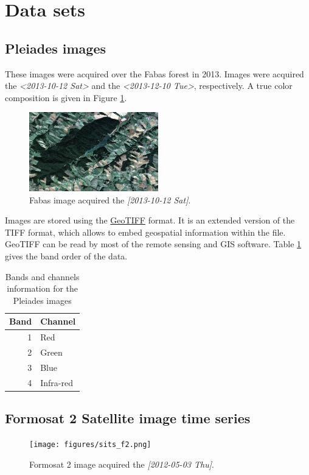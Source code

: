 \documentclass[a4paper,11pt,DIV=18]{scrartcl}
\begin{document}
\section{Data sets}
\label{sec:orgde8ea81}
\subsection{Pleiades images}
\label{sec:orge661967}
These images were acquired over the  Fabas forest in 2013. Images were
acquired   the   \textit{<2013-10-12 Sat>    }    and   the   \textit{<2013-12-10 Tue>},
respectively. A true color composition is given in Figure \ref{fig:org8e41fee}.

\begin{figure}[htbp]
\centering
\includegraphics[width=0.5\textwidth]{./figures/quicklook_fabas_12_10_2013.jpg}
\caption{\label{fig:org8e41fee}
Fabas image acquired the \textit{[2013-10-12 Sat]}.}
\end{figure}

Images are stored using the \href{https://trac.osgeo.org/geotiff/}{GeoTIFF} format.  It is an extended version
of  the TIFF  format,  which allows  to  embed geospatial  information
within the file. GeoTIFF can be read by most of the remote sensing and
GIS software. Table \ref{tab:orgeb2b1f8} gives the band order of the data.

\begin{table}[htbp]
\caption{\label{tab:orgeb2b1f8}
Bands and channels information for the Pleiades images}
\centering
\begin{tabular}{rl}
\toprule
Band & Channel\\
\midrule
1 & Red\\
2 & Green\\
3 & Blue\\
4 & Infra-red\\
\bottomrule
\end{tabular}
\end{table}

\subsection{Formosat 2 Satellite image time series}
\label{sec:org0779960}
\begin{figure}[htbp]
\centering
\texttt{[image: figures/sits\_f2.png]}
\caption{\label{fig:orgc53e76a}
Formosat 2 image acquired the \textit{[2012-05-03 Thu]}.}
\end{figure}
\end{document}
